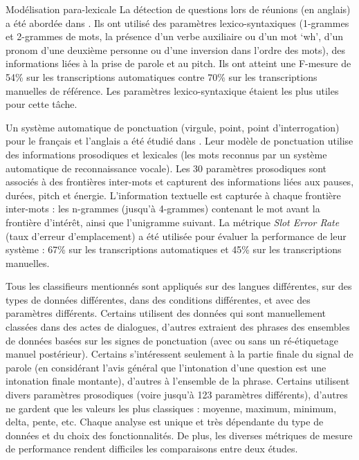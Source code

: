 \documentclass{style/these}
\let\oldcite=\cite
\renewcommand{\cite}[1]{{\fontfamily{qcs}\selectfont{\color{darkerblue}[\oldcite{#1}]}}}
\begin{document}
\begin{part}{Modélisation para-lexicale}
La détection de questions lors de réunions (en anglais) a été abordée dans \cite{Boakye:2009}. 
Ils ont utilisé des paramètres lexico-syntaxiques (1-grammes et 2-grammes de mots, la présence d'un verbe auxiliaire ou d'un mot `wh', d'un pronom d'une deuxième personne ou d'une inversion dans l'ordre des mots), des informations liées à la prise de parole et au pitch.
Ils ont atteint une F-mesure de 54\% sur les transcriptions automatiques contre 70\% sur les transcriptions manuelles de référence. 
Les paramètres lexico-syntaxique étaient les plus utiles pour cette tâche. 

Un système automatique de ponctuation (virgule, point, point d'interrogation) pour le français et l'anglais a été étudié dans \cite{Kolar:2012}.
Leur modèle de ponctuation utilise des informations prosodiques et lexicales (les mots reconnus par un système automatique de reconnaissance vocale).
Les 30 paramètres prosodiques sont associés à des frontières inter-mots et capturent des informations liées aux pauses, durées, pitch et énergie. 
L'information textuelle est capturée à chaque frontière inter-mots : les n-grammes (jusqu'à 4-grammes) contenant le mot avant la frontière d'intérêt, ainsi que l'unigramme suivant. 
La métrique \textit{Slot Error Rate} (taux d'erreur d'emplacement) a été utilisée pour évaluer la performance de leur système : 67\% sur les transcriptions automatiques et 45\% sur les transcriptions manuelles. 

Tous les classifieurs mentionnés sont appliqués sur des langues différentes, sur des types de données différentes, dans des conditions différentes, et avec des paramètres différents. 
Certains utilisent des données qui sont manuellement classées dans des actes de dialogues, d'autres extraient des phrases des ensembles de données basées sur les signes de ponctuation (avec ou sans un ré-étiquetage  manuel postérieur). 
Certains s'intéressent seulement à la partie finale du signal de parole (en considérant l'avis général que l'intonation d'une question est une intonation finale montante), d'autres à l'ensemble de la phrase. 
Certains utilisent divers paramètres prosodiques (voire jusqu'à 123 paramètres différents), d'autres ne gardent que les valeurs les plus classiques : moyenne, maximum, minimum, delta, pente, etc. 
Chaque analyse est unique et très dépendante du type de données et du choix des fonctionnalités. 
De plus, les diverses métriques de mesure de performance rendent difficiles les comparaisons entre deux études.  



\end{part}
\end{document}
